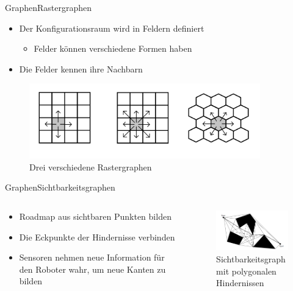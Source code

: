 \documentclass[t,aspectratio=169,dvipsnames]{beamer}
\begin{document}
\begin{frame}{Graphen}{Rastergraphen}
	\begin{itemize}
		\item Der Konfigurationsraum wird in Feldern definiert
		\begin{itemize}
			\item Felder können verschiedene Formen haben
		\end{itemize} 
		\item Die Felder kennen ihre Nachbarn
	\end{itemize}
	\begin{figure}
		\includegraphics[width=10.0cm]{images/Grid_Tiles.png}
		\caption{Drei verschiedene Rastergraphen} 
	\end{figure}
\end{frame}

\begin{frame}{Graphen}{Sichtbarkeitsgraphen}
	\begin{columns}
		\begin{column}[T]{0.5\textwidth}
			\begin{itemize}
				\item Roadmap aus sichtbaren Punkten bilden
				\item Die Eckpunkte der Hindernisse verbinden
				\item Sensoren nehmen neue Information für den Roboter wahr, um neue  Kanten zu bilden
			\end{itemize}
		\end{column}
		\begin{column}[T]{0.5\textwidth}
			\begin{figure}
				\includegraphics[width=6.5cm]{images/Robot_Motion_Visibility_Graph.png}
				\caption{Sichtbarkeitsgraph mit polygonalen Hindernissen} 
			\end{figure}
		\end{column}
	\end{columns}
\end{frame}
\end{document}
